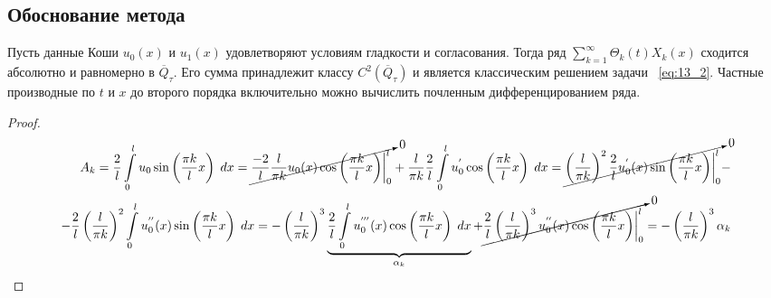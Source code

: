 \documentclass[../main.tex]{subfiles}
\begin{document}
\subsection{Обоснование метода}
\begin{theorem}
Пусть данные Коши $u_0(x)$ и $u_1(x)$ удовлетворяют условиям гладкости и согласования. Тогда ряд $\sum\limits_{k = 1}^{\infty}\Theta_k(t)X_k(x)$ сходится абсолютно и равномерно в $\overline{Q}_{\tau}$. Его сумма принадлежит классу $C^2(\overline{Q}_{\tau})$ и является классическим решением задачи ~\ref{eq:13_2}. Частные производные по $t$ и $x$ до второго порядка 
включительно можно вычислить почленным дифференцированием ряда.
\end{theorem} 
\begin{proof}
\begin{align*}
	A_k = \dfrac{2}{l}\int\limits_{0}^{l}u_0\sin \left(\dfrac{\pi k}{l}x\right)\;dx = \cancelto{0}{\dfrac{-2}{l}\dfrac{l}{\pi k}u_0(x)\cos \left(\dfrac{\pi k}{l}x\right)\biggr|_0^l} + \dfrac{l}{\pi k}\dfrac{2}{l}\int\limits_0^l u_0^{'}\cos \left(\dfrac{\pi k}{l}x\right)\;dx = \cancelto{0}{\left(\dfrac{l}{\pi k}\right)^2 \dfrac{2}{l}u_0^{'}(x)\sin \left(\dfrac{\pi k}{l}x\right)\biggr|_0^l} - \\ - \dfrac{2}{l}\left(\dfrac{l}{\pi k}\right)^2 \int\limits_0^l u_0^{''}(x)\sin \left(\dfrac{\pi k}{l} x\right)\;dx = - \left(\dfrac{l}{\pi k}\right)^3 \underbrace{\dfrac{2}{l} \int\limits_0^l u_0^{'''}(x)\cos \left(\dfrac{\pi k}{l}x\right)\;dx}_{\alpha_k} + \cancelto{0}{\dfrac{2}{l}\left(\dfrac{l}{\pi k}\right)^3u_0^{''}(x)\cos \left(\dfrac{\pi k}{l}x\right)\biggr|_0^l} = - \left(\dfrac{l}{\pi k}\right)^3 \alpha_k
\end{align*}


\end{proof}
\end{document}
